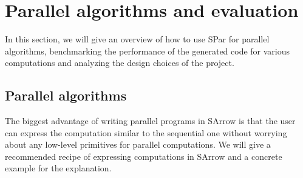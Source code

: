 

\chapter{Parallel algorithms and evaluation} \label{eval} \label{chap:eval}
In this section, we will give an overview of how to use SPar for parallel algorithms, benchmarking the performance of the generated code for various computations and analyzing the design choices of the project.
\section{Parallel algorithms} \label{eval:sec:palgo}
The biggest advantage of writing parallel programs in SArrow is that the user can express the computation similar to the sequential one without worrying about any low-level primitives for parallel computations. We will give a recommended recipe of expressing computations in SArrow and a concrete example for the explanation.

